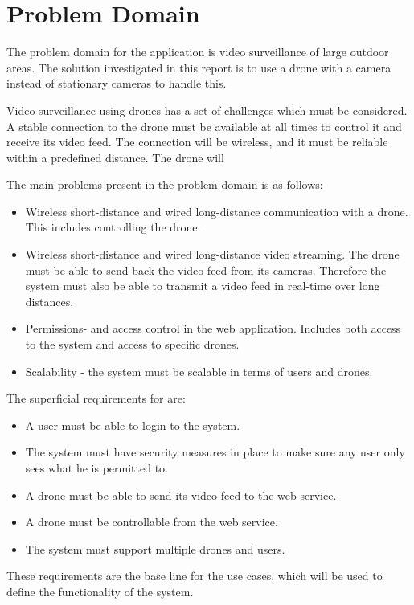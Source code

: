 \section{Problem Domain}\label{problem_domain}
The problem domain for the application is video surveillance of large outdoor areas.
The solution investigated in this report is to use a drone with a camera instead of stationary cameras to handle this. 

Video surveillance using drones has a set of challenges which must be considered.
A stable connection to the drone must be available at all times to control it and receive its video feed.
The connection will be wireless, and it must be reliable within a predefined distance.
The drone will

The main problems present in the problem domain is as follows:
\begin{itemize}
	\item Wireless short-distance and wired long-distance communication with a drone. This includes controlling the drone.
	\item Wireless short-distance and wired long-distance video streaming. The drone must be able to send back the video feed from its cameras. Therefore the system must also be able to transmit a video feed in real-time over long distances. 
	\item Permissions- and access control in the web application. Includes both access to the system and access to specific drones.
	\item Scalability - the system must be scalable in terms of users and drones.
\end{itemize}

The superficial requirements for \projectname{} are:

\begin{itemize}
	\item A user must be able to login to the system.
	\item The system must have security measures in place to make sure any user only sees what he is permitted to. 
	\item A drone must be able to send its video feed to the web service.
	\item A drone must be controllable from the web service. 
	\item The system must support multiple drones and users. 
\end{itemize}

These requirements are the base line for the use cases, which will be used to define the functionality of the system. 
